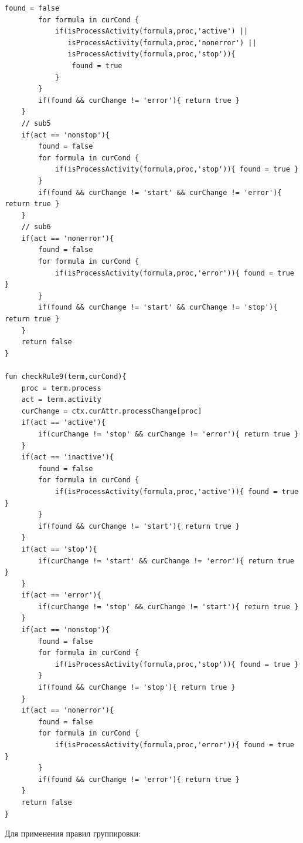 \begin{lstlisting}[style=PseudoStyle,mathescape=true]
        found = false
        for formula in curCond {
            if(isProcessActivity(formula,proc,'active') ||
               isProcessActivity(formula,proc,'nonerror') ||
               isProcessActivity(formula,proc,'stop')){
                found = true
            }
        }
        if(found && curChange != 'error'){ return true }
    }
    // sub5
    if(act == 'nonstop'){
        found = false
        for formula in curCond {
            if(isProcessActivity(formula,proc,'stop')){ found = true }
        }
        if(found && curChange != 'start' && curChange != 'error'){ return true }
    }
    // sub6
    if(act == 'nonerror'){
        found = false
        for formula in curCond {
            if(isProcessActivity(formula,proc,'error')){ found = true }
        }
        if(found && curChange != 'start' && curChange != 'stop'){ return true }
    }
    return false
}

fun checkRule9(term,curCond){
    proc = term.process
    act = term.activity
    curChange = ctx.curAttr.processChange[proc]
    if(act == 'active'){
        if(curChange != 'stop' && curChange != 'error'){ return true }
    }
    if(act == 'inactive'){
        found = false
        for formula in curCond {
            if(isProcessActivity(formula,proc,'active')){ found = true }
        }
        if(found && curChange != 'start'){ return true }
    }
    if(act == 'stop'){
        if(curChange != 'start' && curChange != 'error'){ return true }
    }
    if(act == 'error'){
        if(curChange != 'stop' && curChange != 'start'){ return true }
    }
    if(act == 'nonstop'){
        found = false
        for formula in curCond {
            if(isProcessActivity(formula,proc,'stop')){ found = true }
        }
        if(found && curChange != 'stop'){ return true }
    }
    if(act == 'nonerror'){
        found = false
        for formula in curCond {
            if(isProcessActivity(formula,proc,'error')){ found = true }
        }
        if(found && curChange != 'error'){ return true }
    }
    return false
}
\end{lstlisting}

Для применения правил группировки:

